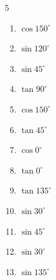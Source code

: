\begin{multicols}{5}
\begin{enumerate}
\resetques

  \item $\displaystyle \cos{150^\circ}$


  \item $\displaystyle \sin{120^\circ}$


  \item $\displaystyle \sin{45^\circ}$


  \item $\displaystyle \tan{90^\circ}$

        \phantom{$\displaystyle なし$}

  \item $\displaystyle \cos{150^\circ}$


  \item $\displaystyle \tan{45^\circ}$

        \phantom{$\displaystyle =1$}

  \item $\displaystyle \cos{0^\circ}$

        \phantom{$\displaystyle =1$}

  \item $\displaystyle \tan{0^\circ}$

        \phantom{$\displaystyle =0$}

  \item $\displaystyle \tan{135^\circ}$

        \phantom{$\displaystyle =-1$}

  \item $\displaystyle \sin{30^\circ}$


  \item $\displaystyle \sin{45^\circ}$


  \item $\displaystyle \sin{30^\circ}$


  \item $\displaystyle \sin{135^\circ}$


\end{enumerate}
\end{multicols}

